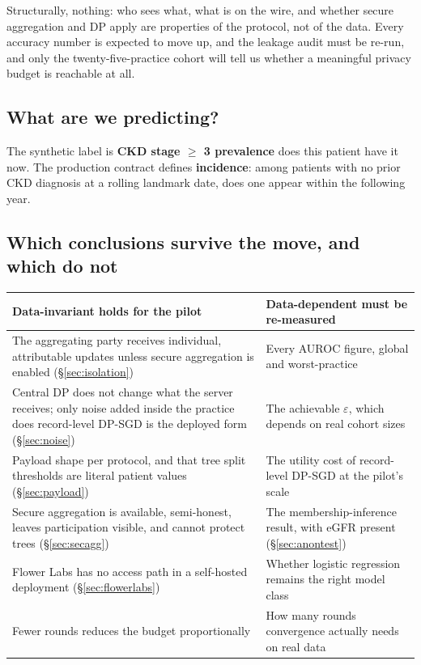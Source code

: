 \label{sec:realdata}
\statusMeasured

\begin{shortanswer}
Structurally, nothing: who sees what, what is on the wire, and whether secure aggregation and DP
apply are properties of the protocol, not of the data. Every accuracy number is expected to move
up, and the leakage audit must be re-run, and only the twenty-five-practice cohort will tell us
whether a meaningful privacy budget is reachable at all.
\end{shortanswer}

\subsection{What are we predicting?}

The synthetic label is \textbf{CKD stage $\ge$ 3 prevalence} does this patient have it now. The
production contract defines \textbf{incidence}: among patients with no prior CKD diagnosis at a
rolling landmark date, does one appear within the following year.

\subsection{Which conclusions survive the move, and which do not}

\begin{center}
\small
\begin{tabular}{p{6.6cm}p{6.6cm}}
  \toprule
  \textbf{Data-invariant holds for the pilot} & \textbf{Data-dependent must be re-measured} \\
  \midrule
  The aggregating party receives individual, attributable updates unless secure aggregation is
  enabled (\S\ref{sec:isolation})
  & Every AUROC figure, global and worst-practice \\
  \addlinespace
  Central DP does not change what the server receives; only noise added inside the practice does
  record-level DP-SGD is the deployed form (\S\ref{sec:noise})
  & The achievable $\varepsilon$, which depends on real cohort sizes \\
  \addlinespace
  Payload shape per protocol, and that tree split thresholds are literal patient values
  (\S\ref{sec:payload})
  & The utility cost of record-level DP-SGD at the pilot's scale \\
  \addlinespace
  Secure aggregation is available, semi-honest, leaves participation visible, and cannot protect
  trees (\S\ref{sec:secagg})
  & The membership-inference result, with eGFR present (\S\ref{sec:anontest}) \\
  \addlinespace
  Flower Labs has no access path in a self-hosted deployment (\S\ref{sec:flowerlabs})
  & Whether logistic regression remains the right model class \\
  \addlinespace
  Fewer rounds reduces the budget proportionally
  & How many rounds convergence actually needs on real data \\
  \bottomrule
\end{tabular}
\end{center}
